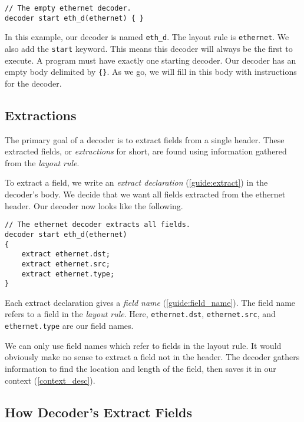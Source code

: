 \begin{codepage}
\begin{lstlisting}
// The empty ethernet decoder.
decoder start eth_d(ethernet) { }
\end{lstlisting}
\end{codepage}

In this example, our decoder is named \texttt{eth\_d}. The layout rule is
\texttt{ethernet}. We also add the \texttt{start} keyword. This means this
decoder will always be the first to execute. A program must have exactly one
starting decoder. Our decoder has an empty body delimited by \texttt{\{\}}. As
we go, we will fill in this body with instructions for the decoder.

\subsection{Extractions} \label{tut:decoder_extract}

The primary goal of a decoder is to extract fields from a single header. These
extracted fields, or \textit{extractions} for short, are found using information
gathered from the \textit{layout rule}.

To extract a field, we write an \textit{extract declaration}
(\ref{guide:extract}) in the decoder's body. We decide that we want all fields
extracted from the ethernet header. Our decoder now looks like the following.

\begin{codepage}
\begin{lstlisting}
// The ethernet decoder extracts all fields.
decoder start eth_d(ethernet)
{
	extract ethernet.dst;
	extract ethernet.src;
	extract ethernet.type;
}
\end{lstlisting}
\end{codepage}

Each extract declaration gives a \textit{field name} (\ref{guide:field_name}).
The field name refers to a field in the \textit{layout rule}. Here,
\texttt{ethernet.dst}, \texttt{ethernet.src}, and \texttt{ethernet.type} are our
field names.

We can only use field names which refer to fields in the layout rule. It would
obviously make no sense to extract a field not in the header. The decoder
gathers information to find the location and length of the field, then saves it
in our context (\ref{context_desc}).

\subsection{How Decoder's Extract Fields} \label{tut:extract_how}

